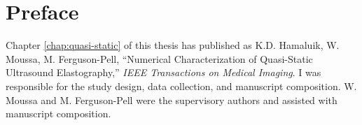 \onehalfspacing
\chapter*{Preface}
	Chapter \ref{chap:quasi-static} of this thesis has published as K.D. Hamaluik, W. Moussa, M. Ferguson-Pell, ``Numerical Characterization of Quasi-Static Ultrasound Elastography,'' \emph{IEEE Transactions on Medical Imaging}. I was responsible for the study design, data collection, and manuscript composition. W. Moussa and M. Ferguson-Pell were the supervisory authors and assisted with manuscript composition.
